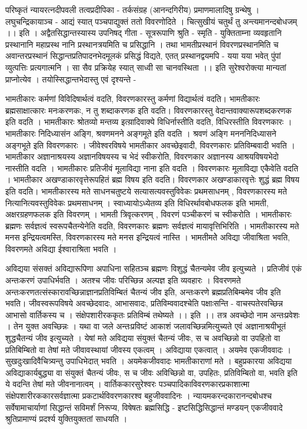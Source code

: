  परिष्कृतं न्यायरत्नदीपवली तत्वप्रदीपिका - तर्कसंग्रह (आनन्दगिरीय) प्रमाणमालादिषु ग्रन्थेषु । लघुचन्द्रिकायाञ्च -
आद्यं स्यात् पञ्चपाद्युक्तं ततो विवरणोदिते । 
चित्सुखीयं चतुर्थं तु अन्त्यमानन्दबोधजम् ।। इति । 
अद्वैतसिद्धान्तस्यास्य उपनिषद् गीता - सूत्ररूपाणि श्रुति - स्मृति - युक्तिताम्ना व्यवहृतानि प्रस्थानानि महाप्रस्थ नानि प्रस्थानत्रयमिति च प्रसिद्धानि । तथा भामतीप्रस्थानं विवरणप्रस्थानमिति च अवान्तरप्रस्थानं सिद्धान्तप्रतिपादनभेदमूलकं प्रसिद्धं विद्यते, एतत् प्रस्थानद्वयमपि - 
यया यया भवेत् पुंपां व्युत्पत्तिः प्रत्यगात्मनि ।
सा सैव प्रक्रियेह स्यात् साध्वी सा चानवस्थिता ।।
इति सुरेश्वरोक्त्या मान्यतां प्राप्नोत्येव । तयोस्सिद्धान्तभेदास्तु एवं दृश्यन्ते - 

भामतीकारः कर्मणां विविदिषार्थत्वं वदति, विवरणकारस्तु कर्मणां विद्यार्थत्वं वदति। भामतीकारः ब्रह्मसाक्षात्कारः मनःकरणकः, न तु शब्दाकरणक इति वदति। विवरणकारस्तु वेदान्तवाक्यारूपशब्दकरणक इति वदति । भामतीकारः श्रोतव्यो मन्तव्य इत्य़ादिवाक्ये विधिर्नास्तीति वदति, विधिरस्तीति विवरणकारः । भामतीकारः निदिध्यासंन अङ्गि, श्रवणमनने अङ्गमूते इति वदति । श्रवणं अङ्गि मनननिदिध्यासने अङ्गभूते इति विवरणकारः । जीवेश्वरविषये भामतीकार अवच्छेइवादी, विवरणकारः प्रतिविम्बवादी भवति । भामतीकार अज्ञानाश्रयस्य अज्ञानविषयस्य च भेदं स्वीकरोति, विवरणकार अज्ञानस्य आश्रयविषयभेदो नास्तीति वदति । भामतीकारः प्रतिजीवं मूलाविद्या नाना इति वदति । विवरणकारः मूलाविद्या एकैवेति वदति । भामतीकार अखण्डाकारवृत्तेरूपहितं ब्रह्म विषय इति वदति। विवरणकार अखण्डाकारवृत्तेः शुद्धं ब्रह्म विषय इति वदति। भामतीकारस्य मते साधनचतुष्टये सत्यासत्यवस्तुविवेकः प्रथमसाधनम् , विवरणकारस्य मते नित्यानित्यवस्तुविवेकः प्रथमसाधनम् । स्वाध्यायोऽध्येतव्य इति विधिरर्थावबोधफलक इति भामती, अक्षरग्रहणफलक इति विवरणम् । भामती त्रिवृत्करणम् , विवरणं पञ्चीकरणं च स्वीकरोति । भामतीकारः ब्रह्मणः सर्वज्ञत्वं स्वरूपचैतन्येनेति वदति, विवरणकारः ब्रह्मणः सर्वज्ञत्वं मायावृत्तिभिरिति । भामतीकारस्य मते मनस इन्द्रियत्वमस्ति, विवरणकारस्य मते मनस इन्द्रियत्वं नास्ति । भामतीमतेे अविद्या जीवाश्रिता भवति, विवरणमते अविद्या ईश्वाराश्रिता भवति ।

	अविद्यया संसक्तं अविद्यारूपिणा अपाधिना सहितञ्च ब्रह्मणः विशुद्धं चैतन्यमेव जीव इत्युच्यते । प्रतिजीवं एकं अन्तःकरणं उपाधिर्भवति । अतश्च जीवः परिच्छिन्न अल्पज्ञ इति व्यवहारः ।
विवरणमते अन्तःकरणतत्संस्कारावच्छिन्नाज्ञानप्रतिविम्बितं चैतन्यं जीव इति, अन्तःकरणे ब्रह्मप्रतिबिम्बमेव जीव इति भवति। जीवस्वरूपविषये अवच्छेदवादः, आभासवादः, प्रतिविम्ववादश्चेति पक्षाःसन्ति - 
वाचस्पतेरवच्छिन्न आभासो वार्तिकस्य च ।
संक्षेपशारीरककृतः प्रतिविम्बं तथेष्यते ।। इति ।। 
तत्र अवच्छेदो नाम अन्तःप्रवेशः । तेन युक्त अवच्छिन्नः । यथा वा जले अन्तःप्रविष्टं आकाशं जलावच्छिन्नमित्युच्यते एवं अज्ञानाश्रयीभूतं शुद्धचैतन्यं जीव इत्युच्यते । येषां मते अविद्यया संयुक्तं चैतन्यं जीवः, स च अवच्छिन्नो वा उपहितो वा प्रतिबिम्बितो वा तेषां मते जीवावस्थायां जीवस्य एकत्वम् । अविद्याया एकत्वात् । अयमेव एकजीववादः । सुखदुःखादिवैचित्र्यन्तु उपाधिभेदात् भवति । अयमेकजीववादः भामतीकाराणां मते । बहुप्रकारया अविद्यया अविद्याकार्यबुद्ध्या वा संयुक्तं चैतन्यं जीवः, स च जीवः अविच्छिन्नो वा, उपहितः, प्रतिविम्बितो वा, भवति इति ये वदन्ति तेषां मते जीवनानात्वम् । वार्तिककारसुरेश्वरः पञ्चपादिकाविवरणकारप्रकाशात्मा संक्षेपशारीरककारसर्वज्ञात्मा प्रकटार्थविवरणकारश्व बहुजीववादिनः । न्यायमकरन्दकारानन्दबोधश्च सर्वेषामाचार्याणां सिद्धान्तं सविमर्शं निरूप्य, विषेषतः ब्रह्मसिद्धि - इष्टसिद्धिसिद्धान्तं मण्डयन् एकजीववादे श्रुतिप्रामाण्यं प्रदर्श्य युक्तियुक्ततां साधयति । 

